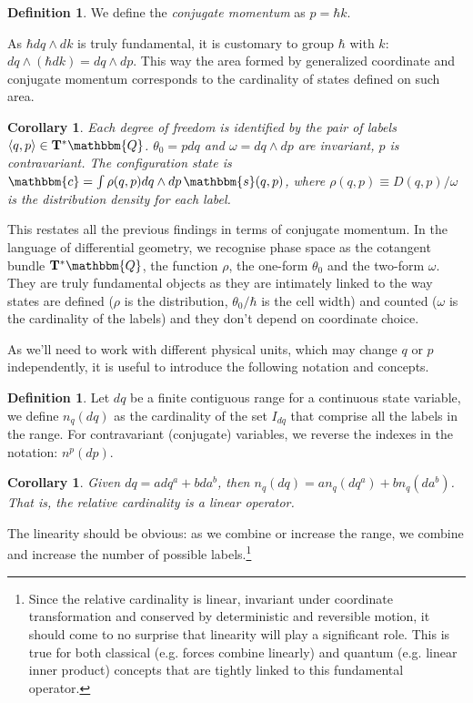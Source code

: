 \documentclass[aps,pra,10pt,twocolumn,floatfix,nofootinbib]{revtex4-1}
\newtheorem{cor}[thm]{Corollary}
\theoremstyle{definition}
\newtheorem{defn}[thm]{Definition}
\begin{document}
\begin{defn}\label{conjugateMomentum}
We define the \emph{conjugate momentum} as $p=\hbar k$.
\end{defn}

As $\hbar dq \wedge dk$ is truly fundamental, it is customary to group $\hbar$ with $k$: $dq \wedge (\hbar dk) = dq \wedge dp$. This way the area formed by generalized coordinate and conjugate momentum corresponds to the cardinality of states defined on such area.

\begin{cor}\label{continuousConjugateRelationships}
Each degree of freedom is identified by the pair of labels $\langle q,p \rangle \in \mathbf{T}^*\mathbbm{Q}$. $\theta_0 = p dq$ and $\omega = dq \wedge dp$ are invariant, $p$ is contravariant. The configuration state is $\mathbbm{c}=\int \rho(q,p) dq \wedge dp \, \mathbbm{s}(q, p)$, where $\rho(q,p)\equiv D(q,p) / \omega$ is the distribution density for each label.
\end{cor}

This restates all the previous findings in terms of conjugate momentum. In the language of differential geometry, we recognise phase space as the cotangent bundle $\mathbf{T}^*\mathbbm{Q}$, the function $\rho$, the one-form $\theta_0$ and the two-form $\omega$. They are truly fundamental objects as they are intimately linked to the way states are defined ($\rho$ is the distribution, $\theta_0 / \hbar$ is the cell width) and counted ($\omega$ is the cardinality of the labels) and they don't depend on coordinate choice.

As we'll need to work with different physical units, which may change $q$ or $p$ independently, it is useful to introduce the following notation and concepts.

\begin{defn}\label{differentialCardinality}
Let $dq$ be a finite contiguous range for a continuous state variable, we define $n_q(dq)$ as the cardinality of the set $I_{dq}$ that comprise all the labels in the range. For contravariant (conjugate) variables, we reverse the indexes in the notation: $n^p(dp)$.
\end{defn}

\begin{cor}\label{linearCardinality}
Given $dq = a dq^a + b da^b$, then $n_q(dq) = a n_q(dq^a) + b n_q(da^b)$. That is, the relative cardinality is a linear operator.
\end{cor}

The linearity should be obvious: as we combine or increase the range, we combine and increase the number of possible labels.\footnote{Since the relative cardinality is linear, invariant under coordinate transformation and conserved by deterministic and reversible motion, it should come to no surprise that linearity will play a significant role. This is true for both classical (e.g. forces combine linearly) and quantum (e.g. linear inner product) concepts that are tightly linked to this fundamental operator.}
\end{document}
